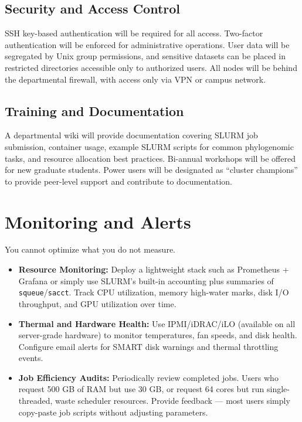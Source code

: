 \subsection{Security and Access Control}

SSH key-based authentication will be required for all access. Two-factor authentication will be enforced for administrative operations. User data will be segregated by Unix group permissions, and sensitive datasets can be placed in restricted directories accessible only to authorized users. All nodes will be behind the departmental firewall, with access only via VPN or campus network.

\subsection{Training and Documentation}

A departmental wiki will provide documentation covering SLURM job submission, container usage, example SLURM scripts for common phylogenomic tasks, and resource allocation best practices. Bi-annual workshops will be offered for new graduate students. Power users will be designated as ``cluster champions'' to provide peer-level support and contribute to documentation.

\section{Monitoring and Alerts}

You cannot optimize what you do not measure.

\begin{itemize}
\item \textbf{Resource Monitoring:} Deploy a lightweight stack such as Prometheus + Grafana or simply use SLURM's built-in accounting plus summaries of \texttt{squeue}/\texttt{sacct}. Track CPU utilization, memory high-water marks, disk I/O throughput, and GPU utilization over time.

\item \textbf{Thermal and Hardware Health:} Use IPMI/iDRAC/iLO (available on all server-grade hardware) to monitor temperatures, fan speeds, and disk health. Configure email alerts for SMART disk warnings and thermal throttling events.

\item \textbf{Job Efficiency Audits:} Periodically review completed jobs. Users who request 500 GB of RAM but use 30 GB, or request 64 cores but run single-threaded, waste scheduler resources. Provide feedback --- most users simply copy-paste job scripts without adjusting parameters.
\end{itemize}

